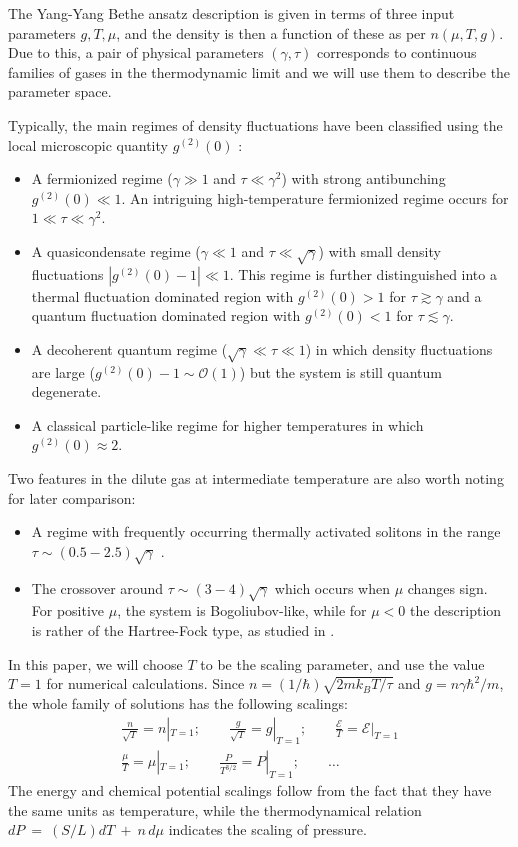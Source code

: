 \documentclass[aps,twocolumn,pra,superscriptaddress,nofootinbib,amsmath,amssymb,floats,floatfix,english]{revtex4-1}
\newcommand{\mc}[1]{{\mathcal{#1}}}
\newcommand{\nonu}{\nonumber}
\newcommand{\eqa}[2]{\begin{eqnarray}#2\label{#1}\end{eqnarray}}
\begin{document}
The Yang-Yang Bethe ansatz description is given in terms of three input parameters $g, T, \mu$, and the density is 
then a function of these as per $n(\mu,T,g)$.
Due to this, a pair of physical parameters $(\gamma,\tau)$ corresponds to continuous families of gases in the thermodynamic limit
and we will use them to describe the parameter space. 

Typically, the main regimes of density fluctuations have been classified using the local microscopic quantity $g^{(2)}(0)$ \cite{Kheruntsyan03}:
\begin{itemize}
\item A fermionized regime ($\gamma\gg1$ and $\tau\ll\gamma^2$) with strong antibunching $g^{(2)}(0)\ll1$. 
An intriguing high-temperature fermionized regime occurs for $1\ll\tau\ll\gamma^2$.
\item A quasicondensate regime ($\gamma\ll1$ and $\tau\ll\sqrt{\gamma}$) with small density fluctuations $|g^{(2)}(0)-1|\ll1$. This regime is further distinguished into a thermal fluctuation dominated region with $g^{(2)}(0)>1$ for $\tau\gtrsim\gamma$ and a quantum fluctuation dominated region  with $g^{(2)}(0)<1$ for $\tau\lesssim\gamma$.
\item A decoherent quantum regime ($\sqrt{\gamma}\ll\tau\ll1$) in which density fluctuations are large ($g^{(2)}(0)-1\sim\mc{O}(1)$) but the system is still quantum degenerate.
\item A classical particle-like regime for higher temperatures in which $g^{(2)}(0)\approx2$.
\end{itemize}
Two features in the dilute gas at intermediate temperature are also worth noting for later comparison: 
\begin{itemize}
\item A regime with frequently occurring thermally activated solitons in the range $\tau\sim (0.5-2.5)\sqrt{\gamma}$ \cite{Karpiuk12,Nowicki17}.
\item The crossover around $\tau\sim(3-4)\sqrt{\gamma}$ which occurs when $\mu$ changes sign. For positive $\mu$, the system is Bogoliubov-like, while for $\mu<0$ the description is rather of the Hartree-Fock type, as studied in \cite{Henkel17}.
\end{itemize}

In this paper, we will choose $T$ to be the scaling parameter, and use
the value $T=1$ for numerical calculations. 
Since $n=(1/\hbar)\sqrt{2mk_BT/\tau}$ and $g=n\gamma\hbar^2/m$, the whole family of solutions has the following scalings:
\eqa{sca}{
\frac{n}{\sqrt{T}} = n|_{T=1}; \qquad 
\frac{g}{\sqrt{T}} = g|_{T=1}; \qquad 
\frac{\mc{E}}{T} = \mc{E}|_{T=1}\nonu\\
\frac{\mu}{T} = \mu|_{T=1}; \qquad
\frac{P}{T^{3/2}} = P|_{T=1};\qquad
\dots \quad
} 
The energy and chemical potential scalings follow from the fact that they have the same units as 
temperature, while the thermodynamical relation $dP~=~(S/L)dT~+~n\,d\mu$ indicates the scaling of pressure.
\end{document}

